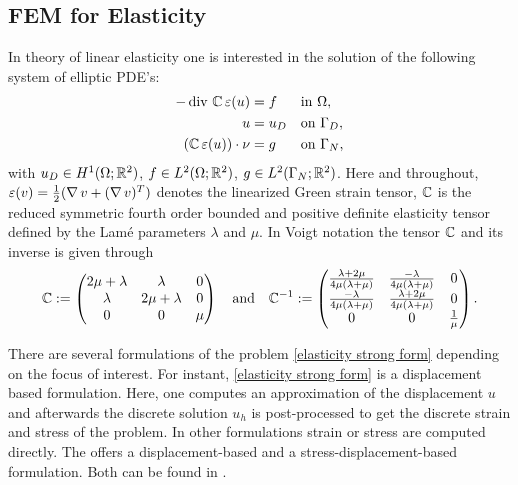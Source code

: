\bigskip
\subsection{FEM for Elasticity}

\noindent In theory of linear elasticity one is interested in the solution of the following system of elliptic PDE's:
\begin{align}\label{elasticity strong form}
-\operatorname{div}\, \mathbb{C}\,\varepsilon(u)&=f &&\text{in }\Omega,\nonumber\\
u&=u_D &&\text{on }\Gamma_D,\\
(\mathbb{C}\,\varepsilon(u))\cdot \nu&=g &&\text{on }\Gamma_N,\nonumber
\end{align}
with $u_D\in H^1(\Omega;\mathbb{R}^2)$, $f\in L^2(\Omega;\mathbb{R}^2)$, $g\in L^2(\Gamma_N;\mathbb{R}^2)$. Here and throughout, $\varepsilon(v)=\frac{1}{2}(\operatorname{\nabla} v+(\operatorname{\nabla} v)^T)$ denotes the linearized Green strain tensor, $\mathbb{C}$ is the reduced symmetric fourth order bounded and positive definite elasticity tensor defined by the Lam\'e parameters $\lambda$ and $\mu$. In Voigt notation the tensor $\mathbb{C}$ and its inverse is given through
\begin{equation*}
\mathbb{C}:=\begin{pmatrix}
2\mu+\lambda & \lambda       & 0\\
\lambda      & 2\mu+\lambda  & 0\\
0            & 0             & \mu
\end{pmatrix} \quad\text{and}\quad
\mathbb{C}^{-1}:=\begin{pmatrix}
\frac{\lambda+2 \mu}{4\mu(\lambda+\mu)} & \frac{-\lambda}{4\mu(\lambda+\mu)}            & 0\\
\frac{-\lambda}{4\mu(\lambda+\mu)}          & \frac{\lambda+2 \mu}{4\mu(\lambda+\mu)} & 0\\
0 & 0 & \frac{1}{\mu}
\end{pmatrix}.
\end{equation*}

\noindent There are several formulations of the problem \eqref{elasticity strong form} depending on the focus of interest. For instant, \eqref{elasticity strong form} is a displacement based formulation. Here, one computes an approximation of the displacement $u$ and afterwards the discrete solution $u_h$ is post-processed to get the discrete strain and stress of the problem. In other formulations strain or stress are computed directly. The \FFW offers a displacement-based and a stress-displacement-based formulation. Both can be found in \cite{Bra}.

